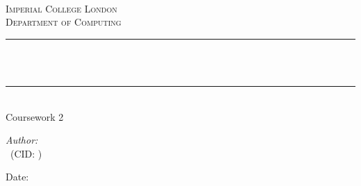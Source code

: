 \begin{titlepage}

\newcommand{\HRule}{\rule{\linewidth}{0.5mm}} %




\begin{center} %

\textsc{\LARGE \reporttype}\\[1.5cm] 
\textsc{\Large Imperial College London}\\[0.5cm] 
\textsc{\large Department of Computing}\\[0.5cm] 

\HRule \\[0.4cm]
{ \huge \bfseries \reporttitle}\\ %
\HRule \\[1.5cm]
Coursework 2
\end{center}

\begin{flushleft} \large
\textit{Author:}\\
\reportauthor~(CID: \cid) %
\end{flushleft}
\vspace{2cm}
\makeatletter
Date: \@date 

\vfill %



\makeatother


\end{titlepage}

